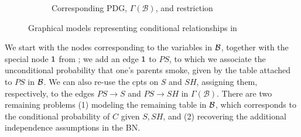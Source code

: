 \documentclass{article}
\newcommand{\MN}{PDG}
\numberwithin{equation}{section}
\begin{document}
\begin{example}[emulating a BN]
\begin{figure*}[ht!]
\begin{subfigure}[b]{0.5\textwidth}
{}
				\caption{Corresponding \MN, $\Gamma(\mathcal B)$, and restriction}
				\label{subfig:smoking-pdg}
			\end{subfigure}
		
			\caption{Graphical models representing conditional relationships in }
			\label{fig:smoking-bn+pdg}
		\end{figure*}
		
%

We start with the nodes corresponding to the variables in $\cal B$,
together with the 
special node $\sf 1$ from %
; we add
an edge ${\sf 1}$ to $\mathit{PS}$, to which we associate the
unconditional probability that one's parents smoke, given by the table
attached to $\mathit{PS}$ in $\cal B$. 
We can also re-use the cpts on $S$ and
                $\mathit{SH}$, assigning them, respectively, to the
                edges $PS \to S$ and $PS \to SH$ in $\Gamma(\mathcal
                B)$. There are two remaining problems
				(1) modeling
                the remaining table in $\cal B$, which corresponds to
                the conditional probability of $C$ given $S,SH$, and
                (2) recovering the additional independence assumptions
                in the BN. 


\end{example}
\end{document}
